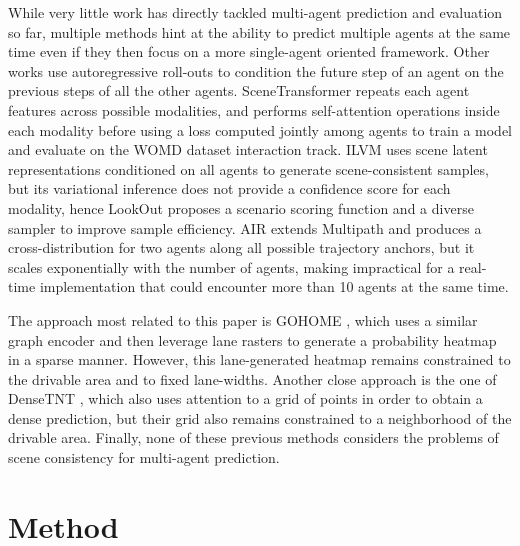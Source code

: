 \documentclass{article} \usepackage{iclr2022_conference,times}
\begin{document}
While very little work has directly tackled multi-agent prediction and evaluation so far, multiple methods hint at the ability to predict multiple agents at the same time \citep{liang2020learning, ivanovic2020mats, zeng2021lanercnn} even if they then focus on a more single-agent oriented framework. Other works \citep{alahi2016social, tang2019multiple, rhinehart2019precog, girgis2021autobots} use autoregressive roll-outs to condition the future step of an agent on the previous steps of all the other agents.
SceneTransformer \citep{ngiam2021scene} repeats each agent features across possible modalities, and performs self-attention operations inside each modality before using a loss computed jointly among agents to train a model and evaluate on the WOMD dataset \citep{ettinger2021large} interaction track. ILVM \citep{casas2020implicit} uses scene latent representations conditioned on all agents to generate scene-consistent samples, but its variational inference does not provide a confidence score for each modality, hence LookOut \citep{cui2021lookout} proposes a scenario scoring function and a diverse sampler to improve sample efficiency. AIR \citep{wu2021air2} extends Multipath \citep{chai2020multipath} and produces a cross-distribution for two agents along all possible trajectory anchors, but it scales exponentially with the number of agents, making impractical for a real-time implementation that could encounter more than 10 agents at the same time.

The approach most related to this paper is GOHOME \citep{gilles2021gohome}, which uses a similar graph encoder and then leverage lane rasters to generate a probability heatmap in a sparse manner. However, this lane-generated heatmap remains constrained to the drivable area and to fixed lane-widths. Another close approach is the one of DenseTNT \citep{gu2021densetnt}, which also uses attention to a grid of points in order to obtain a dense prediction, but their grid also remains constrained to a neighborhood of the drivable area. Finally, none of these previous methods considers the problems of scene consistency for multi-agent prediction. 


\section{Method}
\label{headings}
\end{document}
